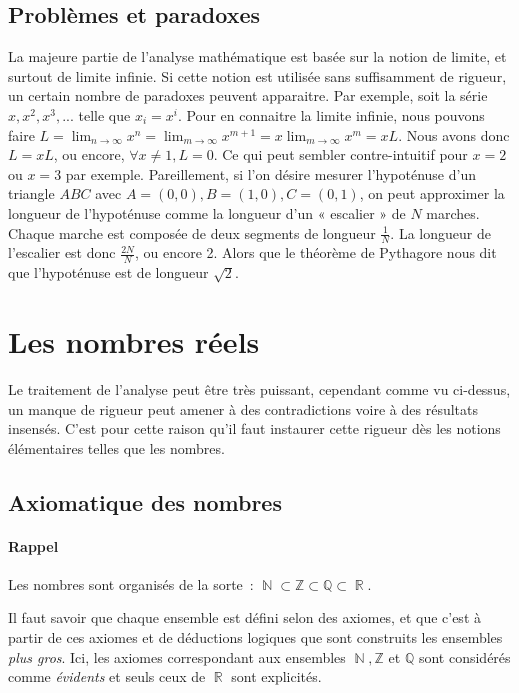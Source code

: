 \documentclass{article}
\DeclareMathOperator{\N}{\mathbb N}
\DeclareMathOperator{\R}{\mathbb R}
\theoremstyle{definition}
\theoremstyle{remark}
\begin{document}
	\subsection{Problèmes et paradoxes}
		La majeure partie de l'analyse mathématique est basée sur la notion de limite, et surtout de limite infinie. Si cette notion est utilisée sans
		suffisamment de rigueur, un certain nombre de paradoxes peuvent apparaitre. Par exemple, soit la série $x, x^2, x^3, ...$ telle que
		$x_i = x^i$. Pour en connaitre la limite infinie, nous pouvons faire $L = \lim_{n\to\infty}x^n = \lim_{m\to\infty}x^{m+1} = x\lim_{m\to\infty}x^m = xL$.
		Nous avons donc $L = xL$, ou encore, $\forall x\neq1, L = 0$. Ce qui peut sembler contre-intuitif pour $x = 2$ ou $x = 3$ par exemple.
		Pareillement, si l'on désire mesurer l'hypoténuse d'un triangle $ABC$ avec $A = (0, 0), B = (1, 0), C = (0, 1)$, on peut approximer la
		longueur de l'hypoténuse comme la longueur d'un « escalier » de $N$ marches. Chaque marche est composée de deux segments de longueur $\frac 1N$.
		La longueur de l'escalier est donc $\frac {2N}{N}$, ou encore 2. Alors que le théorème de Pythagore nous dit que l'hypoténuse est de longueur
		$\sqrt 2$.

\newpage
\section{Les nombres réels}
	Le traitement de l'analyse peut être très puissant, cependant comme vu ci-dessus, un manque de rigueur peut amener à des contradictions voire à
	des résultats insensés. C'est pour cette raison qu'il faut instaurer cette rigueur dès les notions élémentaires telles que les nombres.

	\subsection{Axiomatique des nombres}
		\paragraph{Rappel} Les nombres sont organisés de la sorte~: $\N \subset \mathbb Z\subset \mathbb Q \subset \R$.

		Il faut savoir que chaque ensemble est défini selon des axiomes, et que c'est à partir de ces axiomes et de déductions logiques que sont
		construits les ensembles \textit{plus gros}. Ici, les axiomes correspondant aux ensembles $\N, \mathbb Z$ et $\mathbb Q$ sont considérés
		comme \textit{évidents} et seuls ceux de $\R$ sont explicités.
\end{document}

